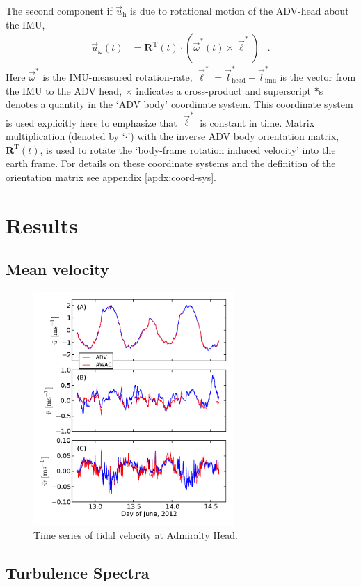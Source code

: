 \documentclass[twocol]{ametsoc}
\def\earth{}
\def\bhv{\ensuremath{\vec{l}_\mathrm{head}^*}}
\def\ihv{\ensuremath{\vec{l}^*_\mathrm{imu}}}
\def\omatinv{\ensuremath{\mathbf{R}^\mathrm{T}}}
\def\ue{\ensuremath{\vec{u}\earth}}
\def\AngRt{\ensuremath{\vec{\omega}}}
\def\ue{\ensuremath{\vec{u}\earth}}
\def\um{\ensuremath{\ue_\mathrm{h}}}
\def\urot{\ensuremath{\ue_\omega}}
\begin{document}
 
The second component if $\um$ is due to rotational motion of the ADV-head about the IMU,
\begin{align}
  \label{eqn:urot-def}
  \urot(t) &  = \omatinv(t) \cdot \left ( \AngRt^*(t)\times\vec{\ell}^*  \right ) & .
\end{align}
Here $\AngRt^*$ is the IMU-measured rotation-rate, $\vec{\ell}^* = \bhv - \ihv$ is the vector from the IMU to the ADV head, $\times$ indicates a cross-product and superscript $*$s denotes a quantity in the `ADV body' coordinate system. This coordinate system is used explicitly here to emphasize that $\vec{\ell}^*$ is constant in time.  Matrix multiplication (denoted by `$\cdot$') with the inverse ADV body orientation matrix, $\omatinv(t)$, is used to rotate the `body-frame rotation induced velocity' into the earth frame.  For details on these coordinate systems and the definition of the orientation matrix see appendix \ref{apdx:coord-sys}.  


\section{Results}

\subsection{Mean velocity}

\begin{figure}[t]
  \centering
  \includegraphics[width=3in]{TimeFig01}
  \caption{Time series of tidal velocity at Admiralty Head.}
  \label{fig:vel_time}
\end{figure}

\subsection{Turbulence Spectra}
\end{document}
